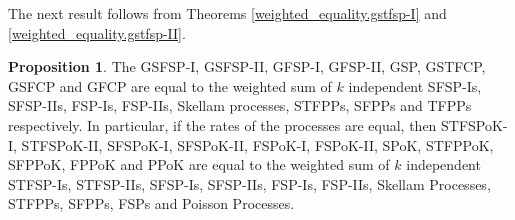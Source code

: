 \documentclass[11pt,oneside,reqno]{amsart}
\theoremstyle{definition}
\newtheorem{theorem}{\bf Theorem}[section]
\newtheorem{proposition}{Proposition}[section]
\theoremstyle{remarkstyle}
\begin{document}
The next result follows from Theorems \ref{weighted_equality.gstfsp-I} and \ref{weighted_equality.gstfsp-II}.
\begin{proposition}\label{weighted.proposition}
The GSFSP-I, GSFSP-II, GFSP-I, GFSP-II, GSP, GSTFCP, GSFCP and GFCP are equal to the weighted sum of $k$ independent SFSP-Is, SFSP-IIs, FSP-Is, FSP-IIs, Skellam processes, STFPPs, SFPPs and TFPPs respectively. In particular, if the rates of the processes are equal, then STFSPoK-I, STFSPoK-II, SFSPoK-I, SFSPoK-II, FSPoK-I, FSPoK-II, SPoK, STFPPoK, SFPPoK, FPPoK and PPoK are equal to the weighted sum of $k$ independent STFSP-Is, STFSP-IIs, SFSP-Is, SFSP-IIs, FSP-Is, FSP-IIs, Skellam Processes, STFPPs, SFPPs, FSPs and Poisson Processes.
\end{proposition}


    
\end{document}
